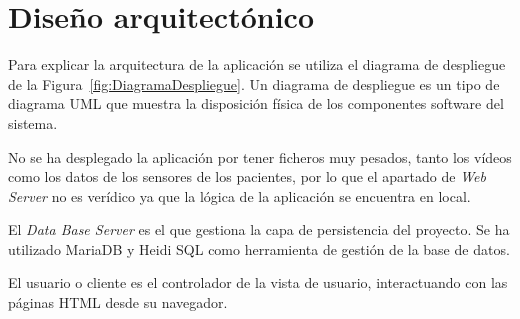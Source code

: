 \section{Diseño arquitectónico}
Para explicar la arquitectura de la aplicación se utiliza el diagrama de despliegue de la Figura~\ref{fig:DiagramaDespliegue}. Un diagrama de despliegue es un tipo de diagrama UML que muestra la disposición física de los componentes software del sistema. 

No se ha desplegado la aplicación por tener ficheros muy pesados, tanto los vídeos como los datos de los sensores de los pacientes, por lo que el apartado de \textit{Web Server} no es verídico ya que la lógica de la aplicación se encuentra en local.

El \textit{Data Base Server} es el que gestiona la capa de persistencia del proyecto. Se ha utilizado MariaDB y Heidi SQL como herramienta de gestión de la base de datos.

El usuario o cliente es el controlador de la vista de usuario, interactuando con las páginas HTML desde su navegador.

